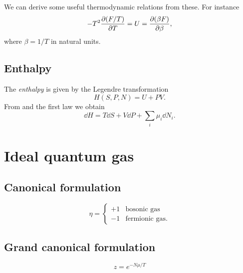 We can derive some useful thermodynamic relations from these. For
instance
\begin{equation}\label{eq:dfdt}
  -T^2\pdv{(F/T)}{T}=U=\pdv{(\beta F)}{\beta},
\end{equation}
where $\beta=1/T$ in natural units.


\subsection{Enthalpy}

The {\it enthalpy} is given by the Legendre transformation
\begin{equation}\label{eq:enthalpy}
 H(S,P,N)=U+PV.
\end{equation}
From  and the first law we obtain
\begin{equation}
 \dd H = T\dd S +V\dd P +\sum_i\mu_i\dd N_i.
\end{equation}


\section{Ideal quantum gas}

\subsection{Canonical formulation}

\begin{equation}
\eta=
  \begin{cases}
     +1 & \text{bosonic gas} \\
     -1 & \text{fermionic gas}.
  \end{cases}
\end{equation}

\subsection{Grand canonical formulation}

\begin{equation}\label{eq:fugacity}
  z=e^{-N\mu/T}
\end{equation}

